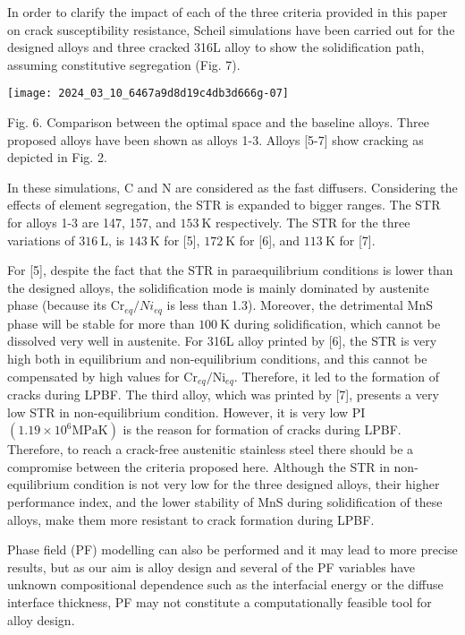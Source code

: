 \documentclass[10pt]{article}
\begin{document}
In order to clarify the impact of each of the three criteria provided in this paper on crack susceptibility resistance, Scheil simulations have been carried out for the designed alloys and three cracked 316L alloy to show the solidification path, assuming constitutive segregation (Fig. 7).

\begin{center}
\texttt{[image: 2024\_03\_10\_6467a9d8d19c4db3d666g-07]}
\end{center}

Fig. 6. Comparison between the optimal space and the baseline alloys. Three proposed alloys have been shown as alloys 1-3. Alloys [5-7] show cracking as depicted in Fig. 2.

In these simulations, $\mathrm{C}$ and $\mathrm{N}$ are considered as the fast diffusers. Considering the effects of element segregation, the STR is expanded to bigger ranges. The STR for alloys 1-3 are 147, 157, and $153 \mathrm{~K}$ respectively. The STR for the three variations of $316 \mathrm{~L}$, is $143 \mathrm{~K}$ for [5], $172 \mathrm{~K}$ for [6], and $113 \mathrm{~K}$ for [7].

For [5], despite the fact that the STR in paraequilibrium conditions is lower than the designed alloys, the solidification mode is mainly dominated by austenite phase (because its $\mathrm{Cr}_{e q} / N i_{e q}$ is less than 1.3). Moreover, the detrimental MnS phase will be stable for more than $100 \mathrm{~K}$ during solidification, which cannot be dissolved very well in austenite. For 316L alloy printed by [6], the STR is very high both in equilibrium and non-equilibrium conditions, and this cannot be compensated by high values for $\mathrm{Cr}_{e q} / \mathrm{Ni}_{e q}$. Therefore, it led to the formation of cracks during LPBF. The third alloy, which was printed by [7], presents a very low STR in non-equilibrium condition. However, it is very low PI $\left(1.19 \times 10^{6} \mathrm{MPaK}\right)$ is the reason for formation of cracks during LPBF. Therefore, to reach a crack-free austenitic stainless steel there should be a compromise between the criteria proposed here. Although the STR in non-equilibrium condition is not very low for the three designed alloys, their higher performance index, and the lower stability of MnS during solidification of these alloys, make them more resistant to crack formation during LPBF.

Phase field (PF) modelling can also be performed and it may lead to more precise results, but as our aim is alloy design and several of the PF variables have unknown compositional dependence such as the interfacial energy or the diffuse interface thickness, PF may not constitute a computationally feasible tool for alloy design.
\end{document}
